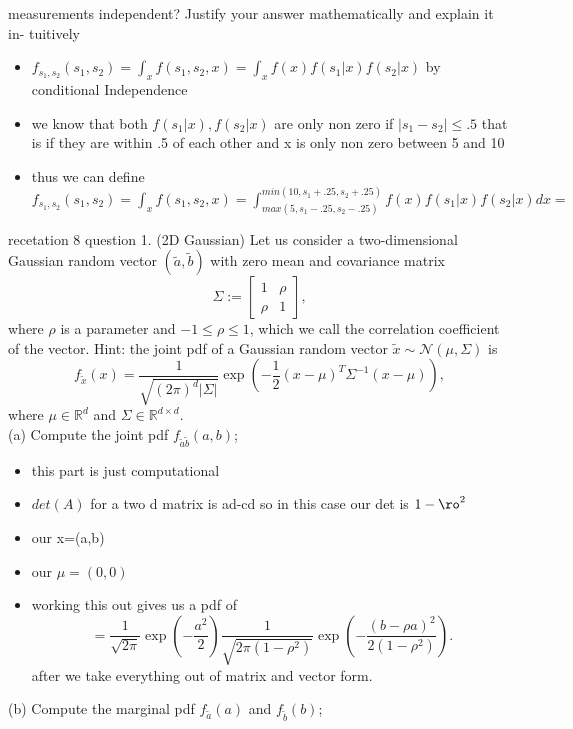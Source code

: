 \documentclass[10pt]{article}
\begin{document}
measurements independent? Justify your answer mathematically and explain it in-
tuitively
\begin{itemize}
    \item $f_{s_1,s_2}(s_1,s_2)=\int_xf(s_1,s_2,x)=\int_{x}f(x)f(s_1|x)f(s_2|x)$ by conditional Independence 
    \item we know that both $f(s_1|x),f(s_2|x)$ are only non zero if $|s_1-s_2|\leq .5$ that is if they are within .5 of each other and x is only non zero between 5 and 10
    \item thus we can define $f_{s_1,s_2}(s_1,s_2)=\int_xf(s_1,s_2,x)=\int_{max(5,s_1-.25,s_2-.25)}^{min(10,s_1+.25,s_2+.25)}f(x)f(s_1|x)f(s_2|x)dx=$ 
\end{itemize}


recetation 8 question 1. (2D Gaussian) Let us consider a two-dimensional Gaussian random vector $(\tilde{a}, \tilde{b})$ with zero mean and covariance matrix
$$
\Sigma:=\left[\begin{array}{ll}
1 & \rho \\
\rho & 1
\end{array}\right],
$$
where $\rho$ is a parameter and $-1 \leq \rho \leq 1$, which we call the correlation coefficient of the vector. Hint: the joint pdf of a Gaussian random vector $\tilde{x} \sim \mathcal{N}(\mu, \Sigma)$ is
$$
f_{\tilde{x}}(x)=\frac{1}{\sqrt{(2 \pi)^d|\Sigma|}} \exp \left(-\frac{1}{2}(x-\mu)^T \Sigma^{-1}(x-\mu)\right),
$$
where $\mu \in \mathbb{R}^d$ and $\Sigma \in \mathbb{R}^{d \times d}$.\\
(a) Compute the joint pdf $f_{\tilde{a} \tilde{b}}(a, b)$;
\begin{itemize}
    \item this part is just computational 
    \item $det(A)$ for a two d matrix is ad-cd so in this case our det is $1-\ro^2$
    \item our x=(a,b)
    \item our $\mu=(0,0)$
    \item working this out gives us a pdf of $$
=\frac{1}{\sqrt{2 \pi}} \exp \left(-\frac{a^2}{2}\right) \frac{1}{\sqrt{2 \pi\left(1-\rho^2\right)}} \exp \left(-\frac{(b-\rho a)^2}{2\left(1-\rho^2\right)}\right) .
$$ after we take everything out of matrix and vector form. 

\end{itemize}
(b) Compute the marginal pdf $f_{\tilde{a}}(a)$ and $f_{\tilde{b}}(b)$;
\end{document}
